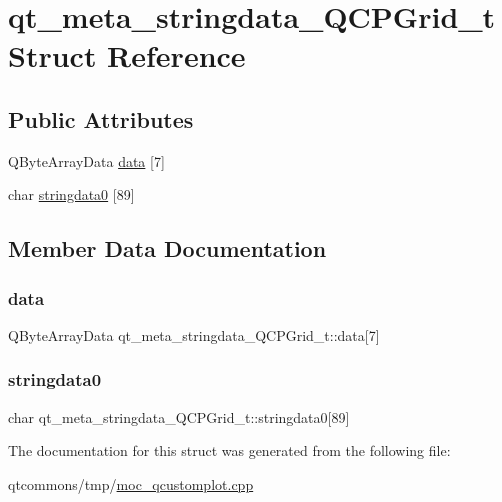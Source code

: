 \hypertarget{structqt__meta__stringdata___q_c_p_grid__t}{}\section{qt\+\_\+meta\+\_\+stringdata\+\_\+\+Q\+C\+P\+Grid\+\_\+t Struct Reference}
\label{structqt__meta__stringdata___q_c_p_grid__t}
\subsection*{Public Attributes}
\begin{DoxyCompactItemize}
\item 
Q\+Byte\+Array\+Data \mbox{\hyperlink{structqt__meta__stringdata___q_c_p_grid__t_ad7520be1ee34a662890da1cb1384cf28}{data}} \mbox{[}7\mbox{]}
\item 
char \mbox{\hyperlink{structqt__meta__stringdata___q_c_p_grid__t_a125926539385574413c9ff82323a34ca}{stringdata0}} \mbox{[}89\mbox{]}
\end{DoxyCompactItemize}


\subsection{Member Data Documentation}
\mbox{\label{structqt__meta__stringdata___q_c_p_grid__t_ad7520be1ee34a662890da1cb1384cf28}} 
\subsubsection{\texorpdfstring{data}{data}}
{\footnotesize\ttfamily Q\+Byte\+Array\+Data qt\+\_\+meta\+\_\+stringdata\+\_\+\+Q\+C\+P\+Grid\+\_\+t\+::data\mbox{[}7\mbox{]}}

\mbox{\label{structqt__meta__stringdata___q_c_p_grid__t_a125926539385574413c9ff82323a34ca}} 
\subsubsection{\texorpdfstring{stringdata0}{stringdata0}}
{\footnotesize\ttfamily char qt\+\_\+meta\+\_\+stringdata\+\_\+\+Q\+C\+P\+Grid\+\_\+t\+::stringdata0\mbox{[}89\mbox{]}}



The documentation for this struct was generated from the following file\+:\begin{DoxyCompactItemize}
\item 
qtcommons/tmp/\mbox{\hyperlink{moc__qcustomplot_8cpp}{moc\+\_\+qcustomplot.\+cpp}}\end{DoxyCompactItemize}
